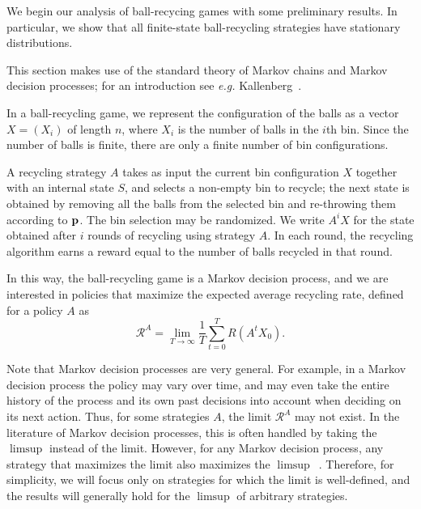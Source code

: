 

We begin our analysis of ball-recycing games with some preliminary results.  In
particular, we show that all finite-state ball-recycling strategies have
stationary distributions.


This section makes use of the standard theory of Markov chains and Markov
decision processes; for an introduction see {\it e.g.}
Kallenberg~\cite{Kallenberg16}.

In a ball-recycling game, we represent the configuration of the balls as a
vector $X=(X_i)$ of length $n$, where $X_i$ is the number of balls in the $i$th
bin.  Since the number of balls is finite, there are only a finite number of bin
configurations.

A recycling strategy $A$ takes as input the current bin configuration $X$
together with an internal state $S$, and selects a non-empty bin to recycle;
the next state is obtained by removing all the balls from the selected bin and
re-throwing them according to $\mathbf{p}$. The bin selection may be randomized.  We
write $A^iX$ for the state obtained after $i$ rounds of recycling using
strategy $A$.  In each round, the recycling algorithm earns a reward equal to
the number of balls recycled in that round.

In this way, the ball-recycling game is a Markov decision process, and we are
interested in policies that maximize the expected average recycling rate,
defined for a policy $A$ as
\begin{equation*}
	\mathcal{R}^A = \lim_{T\rightarrow\infty} \frac{1}{T}\sum_{t=0}^{T} R(A^tX_0).
\end{equation*}

Note that Markov decision processes are very general.  For example, in a Markov
decision process the policy may vary over time, and may even take the entire
history of the process and its own past decisions into account when deciding on
its next action.  Thus, for some strategies $A$, the limit $\mathcal{R}^A$ may
not exist.  In the literature of Markov decision processes, this is often
handled by taking the $\limsup$ instead of the limit. However, for any Markov
decision process, any strategy that maximizes the limit also maximizes the
$\limsup$~\cite{Kallenberg16}.  Therefore, for simplicity, we will focus only
on strategies for which the limit is well-defined, and the results will
generally hold for the $\limsup$ of arbitrary strategies.

